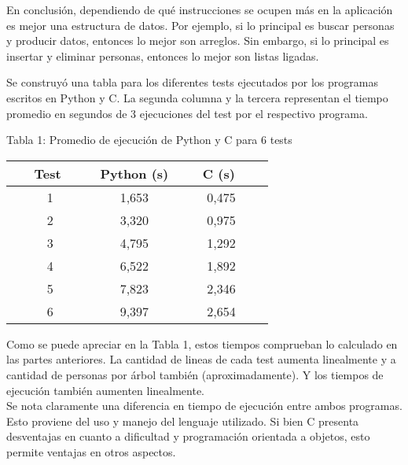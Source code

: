 \documentclass[letter]{article}
\begin{document}
\begin{parte}{2}
	En conclusión, dependiendo de qué instrucciones se ocupen más en la aplicación es mejor una estructura de datos. Por ejemplo, si lo principal es buscar personas y producir datos, entonces lo mejor son arreglos. Sin embargo, si lo principal es insertar y eliminar personas, entonces lo mejor son listas ligadas.\\
			
	\end{parte}

	\begin{parte}{3}
		
		Se construyó una tabla para los diferentes tests ejecutados por los programas escritos en Python y C. La segunda columna y la tercera representan el tiempo promedio en segundos de 3 ejecuciones del test por el respectivo programa.\\
		
		\begin{center}
			Tabla 1: Promedio de ejecución de Python y C para 6 tests\\
			\vspace{0.2cm}
			
			\def\arraystretch{2.2}
			\begin{tabular}{ |c|c|c| }
				\hline
				\ \ \ Test \ \ \ & Python (s) & \ \ \ C (s) \ \ \ \\
				\hline
				1 & 1,653 & 0,475 \\
				2 & 3,320 & 0,975 \\
				3 & 4,795 & 1,292 \\
				4 & 6,522 & 1,892 \\
				5 & 7,823 & 2,346 \\
				6 & 9,397 & 2,654 \\
				\hline
			\end{tabular}
		\end{center}
	
		\vspace{0.5cm}
		
		Como se puede apreciar en la Tabla 1, estos tiempos comprueban lo calculado en las partes anteriores. La cantidad de lineas de cada test aumenta linealmente y a cantidad de personas por árbol también (aproximadamente). Y los tiempos de ejecución también aumenten linealmente.\\
		
		Se nota claramente una diferencia en tiempo de ejecución entre ambos programas. Esto proviene del uso y manejo del lenguaje utilizado. Si bien C presenta desventajas en cuanto a dificultad y programación orientada a objetos, esto permite ventajas en otros aspectos.\\
		

\end{parte}
\end{document}
